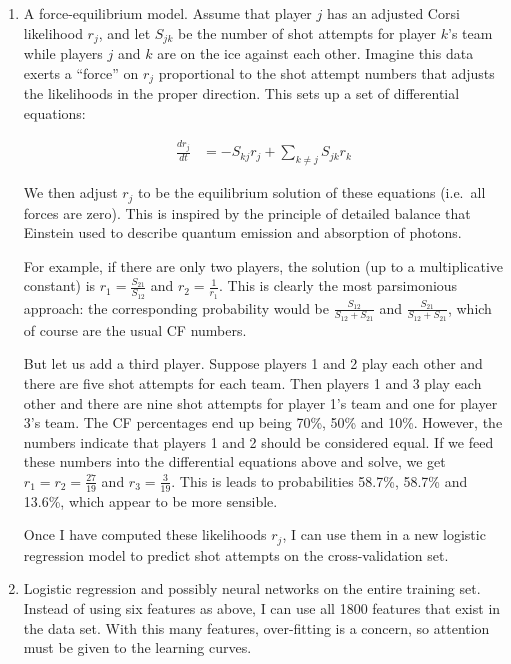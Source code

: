 \documentclass[11pt]{article}
\begin{document}
\begin{enumerate}
\def\labelenumi{\arabic{enumi}.}
\item
  A force-equilibrium model. Assume that player $j$ has an adjusted
  Corsi likelihood $r_j$, and let $S_{jk}$ be the number of shot
  attempts for player $k$'s team while players $j$ and $k$ are on the
  ice against each other. Imagine this data exerts a ``force'' on $r_j$
  proportional to the shot attempt numbers that adjusts the likelihoods
  in the proper direction. This sets up a set of differential equations:

  \begin{align}
  \frac{dr_j}{dt} &= -S_{kj}r_j + \sum_{k\ne j}  S_{jk}r_k
  \end{align}

  We then adjust $r_j$ to be the equilibrium solution of these equations
  (i.e.~all forces are zero). This is inspired by the principle of
  detailed balance that Einstein used to describe quantum emission and
  absorption of photons.

  For example, if there are only two players, the solution (up to a
  multiplicative constant) is $r_1 = \frac{S_{21}}{S_{12}}$ and
  $r_2=\frac{1}{r_1}$. This is clearly the most parsimonious approach: the
  corresponding probability would be $\frac{S_{12}}{S_{12}+S_{21}}$ and
  $\frac{S_{21}}{S_{12}+S_{21}}$, which of course are the usual CF
  numbers.

  But let us add a third player. Suppose players 1 and 2 play each other
  and there are five shot attempts for each team. Then players 1 and 3 play
  each other and there are nine shot attempts for player 1's team and
  one for player 3's team. The CF percentages end up being 70\%, 50\%
  and 10\%. However, the numbers indicate that players 1 and 2 should be considered equal.
  If we feed these numbers into the differential equations above and
  solve, we get $r_1 = r_2 = \frac{27}{19}$ and $r_3 = \frac{3}{19}$.
  This is leads to probabilities 58.7\%, 58.7\% and 13.6\%, which appear
  to be more sensible.

  Once I have computed these likelihoods $r_j$, I can use them in a new
  logistic regression model to predict shot attempts on the
  cross-validation set.
\item
  Logistic regression and possibly neural networks on the entire
  training set. Instead of using six features as above, I can use all
  1800 features that exist in the data set. With this many features,
  over-fitting is a concern, so attention must be given to the learning
  curves.
\end{enumerate}

    
    
    
\end{document}
